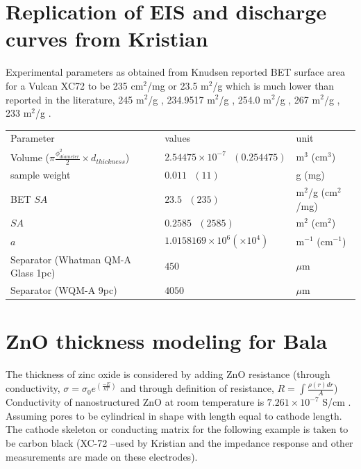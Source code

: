 \documentclass[12pt]{book}
\begin{document}
\section{Replication of EIS and discharge curves from Kristian}
Experimental parameters as obtained from \cite{Knudsen2016}
Knudsen reported BET surface area for a Vulcan XC72 to be 235 cm$^2$/mg or 23.5 m$^2$/g which is  much lower than reported in the literature, 245 m$^2$/g \cite{Pantea2003}, 234.9517 m$^2$/g \cite{Lee2006}, 254.0 m$^2$/g \cite{Pantea2001}, 267 m$^2$/g \cite{Yang2004}, 233 m$^2$/g \cite{Gunasekara2015}.
\begin{center}
	\begin{tabular}{|l l l|}
		\hline		
           Parameter &  values & unit  \\
           Volume ($\pi \frac{\phi^2_{diameter}}{2}\times d_{thickness}$) &
           
           
           $2.54475\times 10^{-7} \textrm{ }(0.254475)$ & m$^3$ (cm$^3$)\\
           sample weight & $0.011\textrm{ }(11)$ & g (mg) \\
           BET $SA$   & $23.5\textrm{ }(235)$ &	m$^2$/g (cm$^2$/mg) \\
           $SA$   & $0.2585\textrm{ }(2585)$ &	m$^2$ (cm$^2$) \\           
           $a$  & $1.0158169\times 10^{6}  (\times 10^{4})$ & m$^{-1}$ (cm$^{-1}$) 	\\
           Separator (Whatman QM-A Glass 1pc) & $450$& $\mu$m \\
           Separator (WQM-A 9pc) & $4050$&  $\mu$m\\
           
		\hline
	\end{tabular}
\end{center}
\section{ZnO thickness modeling for Bala}
The thickness of zinc oxide is considered by adding ZnO resistance (through conductivity, $\sigma = \sigma_0e^{\left(\frac{-E}{kT}\right)}$ and through definition of resistance, $R=\int\frac{\rho(r)dr}{A}$) Conductivity of nanostructured ZnO at room temperature is $7.261\times 10^{-7}$ S/cm \cite{Caglar2009}. Assuming pores to be cylindrical in shape with length equal to cathode length.  The cathode skeleton or conducting matrix for the following example is taken to be carbon black (XC-72 --used by Kristian and the impedance response and other measurements are made on these electrodes). 
\end{document}
